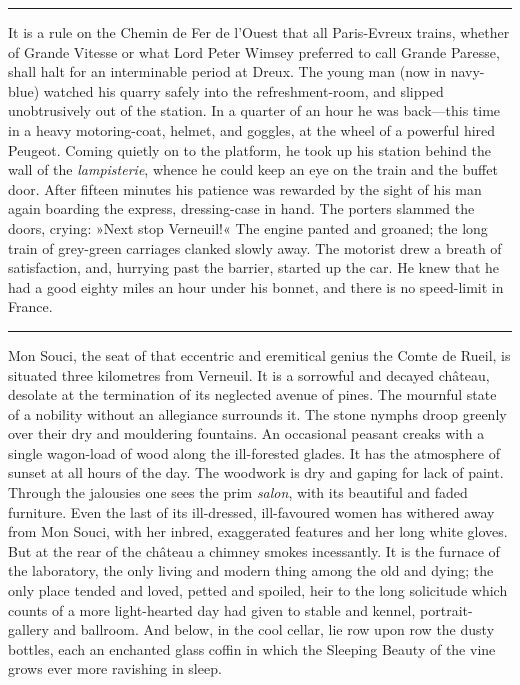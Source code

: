 \noindent\hfil\rule{0.5\textwidth}{.4pt}\hfil 

It is a rule on the Chemin de Fer de l'Ouest that all Paris-Evreux trains, whether of Grande Vitesse or what Lord Peter Wimsey preferred to call Grande Paresse, shall halt for an interminable period at Dreux. The young man (now in navy-blue) watched his quarry safely into the refreshment-room, and slipped unobtrusively out of the station. In a quarter of an hour he was back—this time in a heavy motoring-coat, helmet, and goggles, at the wheel of a powerful hired Peugeot. Coming quietly on to the platform, he took up his station behind the wall of the \textit{lampisterie}, whence he could keep an eye on the train and the buffet door. After fifteen minutes his patience was rewarded by the sight of his man again boarding the express, dressing-case in hand. The porters slammed the doors, crying: »Next stop Verneuil!« The engine panted and groaned; the long train of grey-green carriages clanked slowly away. The motorist drew a breath of satisfaction, and, hurrying past the barrier, started up the car. He knew that he had a good eighty miles an hour under his bonnet, and there is no speed-limit in France.

\noindent\hfil\rule{0.5\textwidth}{.4pt}\hfil 

Mon Souci, the seat of that eccentric and eremitical genius the Comte de Rueil, is situated three kilometres from Verneuil. It is a sorrowful and decayed château, desolate at the termination of its neglected avenue of pines. The mournful state of a nobility without an allegiance surrounds it. The stone nymphs droop greenly over their dry and mouldering fountains. An occasional peasant creaks with a single wagon-load of wood along the ill-forested glades. It has the atmosphere of sunset at all hours of the day. The woodwork is dry and gaping for lack of paint. Through the jalousies one sees the prim \textit{salon}, with its beautiful and faded furniture. Even the last of its ill-dressed, ill-favoured women has withered away from Mon Souci, with her inbred, exaggerated features and her long white gloves. But at the rear of the château a chimney smokes incessantly. It is the furnace of the laboratory, the only living and modern thing among the old and dying; the only place tended and loved, petted and spoiled, heir to the long solicitude which counts of a more light-hearted day had given to stable and kennel, portrait-gallery and ballroom. And below, in the cool cellar, lie row upon row the dusty bottles, each an enchanted glass coffin in which the Sleeping Beauty of the vine grows ever more ravishing in sleep.

